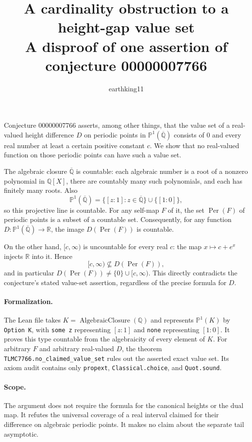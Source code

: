 \documentclass[11pt]{article}
\title{A cardinality obstruction to a height-gap value set\\
  A disproof of one assertion of conjecture 00000007766}
\author{earthking11}
\date{}
\begin{document}
\maketitle

Conjecture 00000007766 asserts, among other things, that the value set of
a real-valued height difference $D$ on periodic points in
$\mathbb P^1(\overline{\mathbb Q})$ consists of $0$ and every real number at
least a certain positive constant $c$. We show that no real-valued function
on those periodic points can have such a value set.

The algebraic closure $\overline{\mathbb Q}$ is countable: each algebraic
number is a root of a nonzero polynomial in $\mathbb Q[X]$, there are
countably many such polynomials, and each has finitely many roots. Also
\[
  \mathbb P^1(\overline{\mathbb Q})
  =\{[z:1]:z\in\overline{\mathbb Q}\}\cup\{[1:0]\},
\]
so this projective line is countable. For any self-map $F$ of it, the set
$\operatorname{Per}(F)$ of periodic points is a subset of a countable set.
Consequently, for any function $D:\mathbb P^1(\overline{\mathbb Q})\to
\mathbb R$, the image $D(\operatorname{Per}(F))$ is countable.

On the other hand, $[c,\infty)$ is uncountable for every real $c$: the map
$x\mapsto c+e^x$ injects $\mathbb R$ into it. Hence
\[
  [c,\infty)\not\subseteq D(\operatorname{Per}(F)),
\]
and in particular
$D(\operatorname{Per}(F))\neq\{0\}\cup[c,\infty)$.
This directly contradicts the conjecture's stated value-set assertion,
regardless of the precise formula for $D$.

\paragraph{Formalization.}
The Lean file takes $K=\operatorname{AlgebraicClosure}(\mathbb Q)$ and
represents $\mathbb P^1(K)$ by \texttt{Option K}, with \texttt{some z}
representing $[z:1]$ and \texttt{none} representing $[1:0]$.
It proves this type countable from the algebraicity of every element of $K$.
For arbitrary $F$ and arbitrary real-valued $D$, the theorem
\texttt{TLMC7766.no\_claimed\_value\_set} rules out the asserted exact
value set. Its axiom audit contains only \texttt{propext},
\texttt{Classical.choice}, and \texttt{Quot.sound}.

\paragraph{Scope.}
The argument does not require the formula for the canonical heights or the
dual map. It refutes the universal coverage of a real interval claimed for
their difference on algebraic periodic points. It makes no claim about the
separate tail asymptotic.
\end{document}
